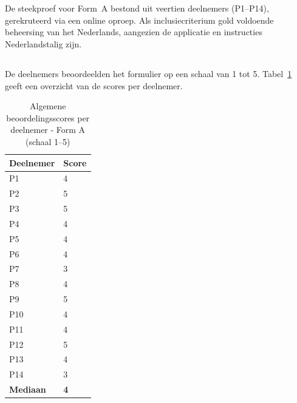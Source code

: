\section{}
\label{sec:vroeg-forma}

\subsection{}

De steekproef voor Form~A bestond uit veertien deelnemers (P1–P14), gerekruteerd via een online oproep. Als inclusiecriterium gold voldoende beheersing van het Nederlands, aangezien de applicatie en instructies Nederlandstalig zijn.

\subsection{}

\subsubsection{}

De deelnemers beoordeelden het formulier op een schaal van 1 tot 5. Tabel~\ref{tab:vroeg-ratings} geeft een overzicht van de scores per deelnemer.

\begin{table}[h]
  \centering
  \caption[Algemene beoordelingsscores vroege test Form A]{Algemene beoordelingsscores per deelnemer - Form A (schaal 1–5)}
  \label{tab:vroeg-ratings}
  \begin{tabular}{ll}
    \hline
    \textbf{Deelnemer} & \textbf{Score} \\
    \hline
    P1  & 4 \\
    P2  & 5 \\
    P3  & 5 \\
    P4  & 4 \\
    P5  & 4 \\
    P6  & 4 \\
    P7  & 3 \\
    P8  & 4 \\
    P9  & 5 \\
    P10 & 4 \\
    P11 & 4 \\
    P12 & 5 \\
    P13 & 4 \\
    P14 & 3 \\
    \hline
    \textbf{Mediaan} & \textbf{4} \\
    \hline
  \end{tabular}
\end{table}

